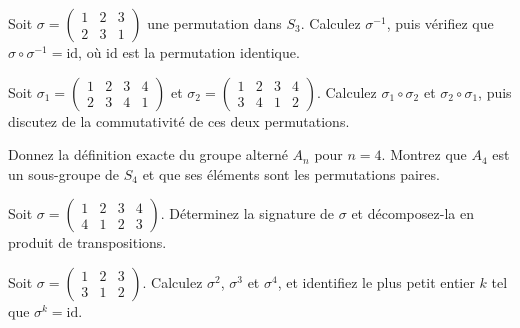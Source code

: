 \begin{exercice}
Soit \( \sigma = \begin{pmatrix} 1 & 2 & 3 \\ 2 & 3 & 1 \end{pmatrix} \) une permutation dans \( S_3 \). Calculez \( \sigma^{-1} \), puis vérifiez que \( \sigma \circ \sigma^{-1} = \text{id} \), où \( \text{id} \) est la permutation identique.
\end{exercice}

\begin{exercice}
Soit \( \sigma_1 = \begin{pmatrix} 1 & 2 & 3 & 4 \\ 2 & 3 & 4 & 1 \end{pmatrix} \) et \( \sigma_2 = \begin{pmatrix} 1 & 2 & 3 & 4 \\ 3 & 4 & 1 & 2 \end{pmatrix} \). Calculez \( \sigma_1 \circ \sigma_2 \) et \( \sigma_2 \circ \sigma_1 \), puis discutez de la commutativité de ces deux permutations.
\end{exercice}

\begin{exercice}
Donnez la définition exacte du groupe alterné \( A_n \) pour \( n = 4 \). Montrez que \( A_4 \) est un sous-groupe de \( S_4 \) et que ses éléments sont les permutations paires.
\end{exercice}

\begin{exercice}
Soit \( \sigma = \begin{pmatrix} 1 & 2 & 3 & 4 \\ 4 & 1 & 2 & 3 \end{pmatrix} \). Déterminez la signature de \( \sigma \) et décomposez-la en produit de transpositions.
\end{exercice}

\begin{exercice}
Soit \( \sigma = \begin{pmatrix} 1 & 2 & 3 \\ 3 & 1 & 2 \end{pmatrix} \). Calculez \( \sigma^2 \), \( \sigma^3 \) et \( \sigma^4 \), et identifiez le plus petit entier \( k \) tel que \( \sigma^k = \text{id} \).
\end{exercice}

